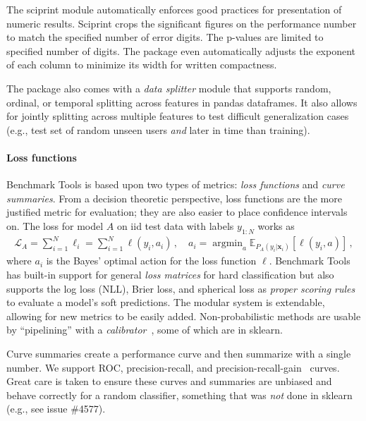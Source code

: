 \documentclass{article}
\renewcommand{\vec}[1]{{\boldsymbol{\mathbf{#1}}}} %
\newcommand{\E}{\mathbb{E}}
\newcommand{\Loss}{\mathcal{L}}
\newcommand{\loss}{\ell}
\DeclareMathOperator*{\argmin}{argmin}
\newcommand{\sectionx}{\paragraph}
\begin{document}
The sciprint module automatically enforces good practices for presentation of numeric results.
Sciprint crops the significant figures on the performance number to match the specified number of error digits.
The p-values are limited to specified number of digits.
The package even automatically adjusts the exponent of each column to minimize its width for written compactness.

The package also comes with a \emph{data splitter} module that supports random, ordinal, or temporal splitting across features in pandas dataframes.
It also allows for jointly splitting across multiple features to test difficult generalization cases (e.g., test set of random unseen users \emph{and} later in time than training)\@.

\sectionx{Loss functions}
Benchmark Tools is based upon two types of metrics: \emph{loss functions} and \emph{curve summaries}.
From a decision theoretic perspective, loss functions are the more justified metric for evaluation; they are also easier to place confidence intervals on.
The loss for model $A$ on iid test data with labels $y_{1:N}$ works as
\begin{align}
  \Loss_A = \sum_{i=1}^N \loss_i = \sum_{i=1}^N \loss(y_i, a_i)\,, \quad a_i = \argmin_a \E_{P_A(y_i|\vec x_i)}[\loss(y_i, a)]\,,
\end{align}
where $a_i$ is the Bayes' optimal action for the loss function $\loss$.
Benchmark Tools has built-in support for general \emph{loss matrices} for hard classification but also supports the log loss (NLL), Brier loss, and spherical loss as \emph{proper scoring rules}~\citep{Gneiting2007} to evaluate a model's soft predictions.
The modular system is extendable, allowing for new metrics to be easily added.
Non-probabilistic methods are usable by ``pipelining'' with a \emph{calibrator}~\citep{Kull2017,Platt1999}, some of which are in sklearn.

Curve summaries create a performance curve and then summarize with a single number.
We support ROC, precision-recall, and precision-recall-gain~\citep{Flach2015} curves.
Great care is taken to ensure these curves and summaries are unbiased and behave correctly for a random classifier, something that was \emph{not} done in sklearn (e.g., see issue \#4577)\@.
\end{document}
